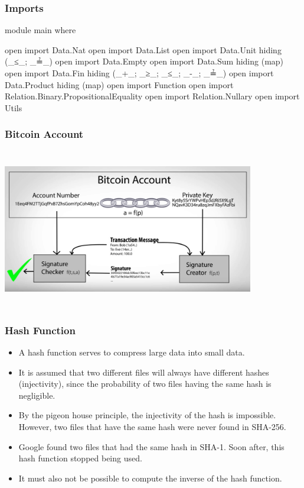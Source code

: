 \documentclass{beamer}
\begin{document}
\begin{frame}
  \frametitle{Imports}
\begin{code}

module main where

open import Data.Nat
open import Data.List
open import Data.Unit hiding (_≤_; _≟_)
open import Data.Empty
open import Data.Sum hiding (map)
open import Data.Fin hiding (_+_; _≥_; _≤_; _-_; _≟_)
open import Data.Product hiding (map)
open import Function
open import Relation.Binary.PropositionalEquality
open import Relation.Nullary
open import Utils

\end{code}
\end{frame}

\begin{frame}
  \frametitle{Bitcoin Account}
    \includegraphics[width=11cm, height=7cm]{privatekey}
\end{frame}

\begin{frame}
  \frametitle{Hash Function}
  \begin{itemize}
    \item A hash function serves to compress large data into small data.
    \item It is assumed that two different files will always have different hashes (injectivity),
      since the probability of two files having the same hash is negligible.
    \item By the pigeon house principle, the injectivity of the hash is impossible.
      However, two files that have the same hash were never found in SHA-256.
    \item Google found two files that had the same hash in SHA-1.
      Soon after, this hash function stopped being used.
    \item It must also not be possible to compute the inverse of the hash function.
  \end{itemize}
\end{frame}
\end{document}
